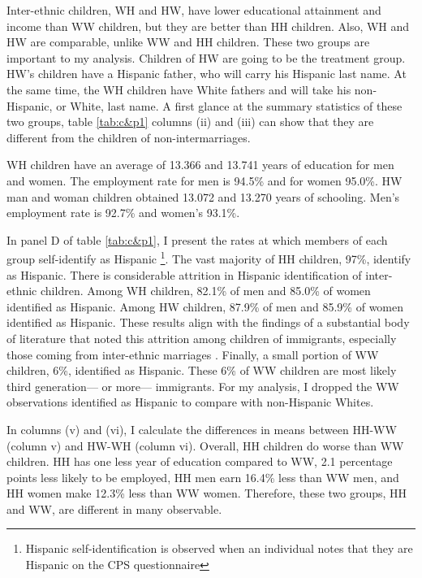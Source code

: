 \documentclass[12pt, fullpage]{article}
\begin{document}
Inter-ethnic children, WH and HW, have lower educational attainment and income than WW children, but they are better than HH children. Also, WH and HW are comparable, unlike WW and HH children. These two groups are important to my analysis. Children of HW are going to be the treatment group. HW's children have a Hispanic father, who will carry his Hispanic last name. At the same time, the WH children have White fathers and will take his non-Hispanic, or White, last name. A first glance at the summary statistics of these two groups, table \ref{tab:c&p1} columns (ii) and (iii) can show that they are different from the children of non-intermarriages. 



\newpage




WH children have an average of 13.366 and 13.741 years of education for men and women. The employment rate for men is 94.5\% and for women 95.0\%. HW man and woman children obtained 13.072 and 13.270 years of schooling. Men's employment rate is 92.7\% and women's 93.1\%.

In panel D of table \ref{tab:c&p1}, I present the rates at which members of each group self-identify as Hispanic \footnote{Hispanic self-identification is observed when an individual notes that they are Hispanic on the CPS questionnaire}. The vast majority of HH children, 97\%, identify as Hispanic. There is considerable attrition in Hispanic identification of inter-ethnic children. Among WH children, 82.1\% of men and 85.0\% of women identified as Hispanic. Among HW children, 87.9\% of men and 85.9\% of women identified as Hispanic. These results align with the findings of a substantial body of literature that noted this attrition among children of immigrants, especially those coming from inter-ethnic marriages \citep{duncan2017complexity, duncan2018identifying, duncan2020new, antman2020ethnic}. Finally, a small portion of WW children, 6\%, identified as Hispanic. These 6\% of WW children are most likely third generation--- or more--- immigrants. For my analysis, I dropped the WW observations identified as Hispanic to compare with non-Hispanic Whites.

In columns (v) and (vi), I calculate the differences in means between HH-WW (column v) and HW-WH (column vi). Overall, HH children do worse than WW children. HH has one less year of education compared to WW, 2.1 percentage points less likely to be employed, HH men earn 16.4\% less than WW men, and HH women make 12.3\% less than WW women. Therefore, these two groups, HH and WW, are different in many observable.
\end{document}

